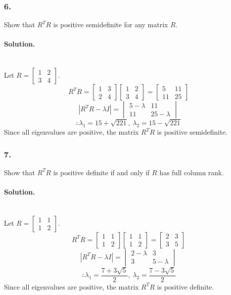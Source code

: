 \subsubsection{6.} Show that $R^TR$ is positive semidefinite for any matrix $R$.
\paragraph{Solution.}\phantom{}\\
Let $R = \begin{bmatrix}
    1&2\\3&4
\end{bmatrix}$.
$$R^TR = \begin{bmatrix}
    1 &3\\2&4
\end{bmatrix}\begin{bmatrix}
    1&2\\3&4
\end{bmatrix} = \begin{bmatrix}
    5 & 11\\11 & 25
\end{bmatrix}$$
$$|R^TR-\lambda I| = \begin{vmatrix}
    5 - \lambda & 11\\11 & 25 - \lambda
\end{vmatrix}$$
$$\therefore \lambda_1 = 15 + \sqrt{221},\ \lambda_2 = 15 - \sqrt{221}$$
Since all eigenvalues are positive, the matrix $R^TR$ is positive semidefinite.

\subsubsection{7.} Show that $R^TR$ is positive definite if and only if $R$ has full column rank.
\paragraph{Solution.}\phantom{}\\
Let $R = \begin{bmatrix}
    1&1\\1&2
\end{bmatrix}$.
$$R^TR = \begin{bmatrix}
    1 &1\\1&2
\end{bmatrix}\begin{bmatrix}
    1&1\\1&2
\end{bmatrix} = \begin{bmatrix}
    2&3\\3&5
\end{bmatrix}$$
$$|R^TR-\lambda I| = \begin{vmatrix}
    2 - \lambda & 3\\3 & 5 - \lambda
\end{vmatrix}$$
$$\therefore \lambda_1 = \frac{7+3\sqrt{5}}{2},\ \lambda_2 = \frac{7-3\sqrt{5}}{2}$$
Since all eigenvalues are positive, the matrix $R^TR$ is positive definite.
\newpage
